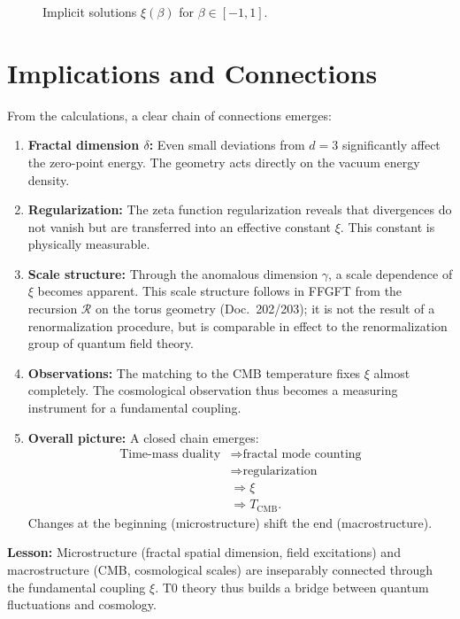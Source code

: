	\begin{figure}[htbp]
		\centering

		\caption{Implicit solutions $\xi(\beta)$ for $\beta\in[-1,1]$.}
		\label{fig:xi_vs_beta}
	\end{figure}
	
	\section{Implications and Connections}
	\label{sec:discussion}
	
	From the calculations, a clear chain of connections emerges:
	
	\begin{enumerate}
		\item \textbf{Fractal dimension $\delta$:} Even small deviations from $d=3$ significantly affect the zero-point energy. The geometry acts directly on the vacuum energy density.
		\item \textbf{Regularization:} The zeta function regularization reveals that divergences do not vanish but are transferred into an effective constant $\xi$. This constant is physically measurable.
		\item \textbf{Scale structure:} Through the anomalous dimension $\gamma$, a scale dependence of $\xi$ becomes apparent. This scale structure follows in FFGFT from the recursion $\mathcal{R}$ on the torus geometry (Doc.~202/203); it is not the result of a renormalization procedure, but is comparable in effect to the renormalization group of quantum field theory.
		\item \textbf{Observations:} The matching to the CMB temperature fixes $\xi$ almost completely. The cosmological observation thus becomes a measuring instrument for a fundamental coupling.
		\item \textbf{Overall picture:} A closed chain emerges:
	\[
	\begin{aligned}
		\text{Time-mass duality} &\Rightarrow \text{fractal mode counting} \\
		&\Rightarrow \text{regularization} \\
		&\Rightarrow \xi \\
		&\Rightarrow T_{\mathrm{CMB}}.
	\end{aligned}
	\]
		Changes at the beginning (microstructure) shift the end (macrostructure).
	\end{enumerate}
	
	\textbf{Lesson:} Microstructure (fractal spatial dimension, field excitations) and macrostructure (CMB, cosmological scales) are inseparably connected through the fundamental coupling $\xi$. T0 theory thus builds a bridge between quantum fluctuations and cosmology.
	
